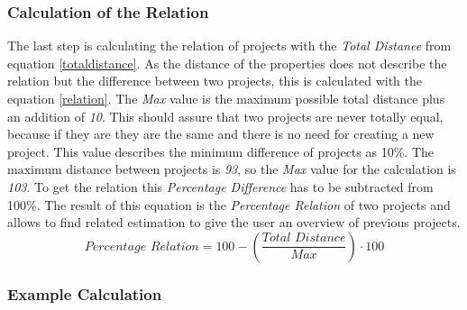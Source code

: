 \subsubsection{\textbf{ Calculation of the Relation}}
The last step is calculating the relation of projects with the \textit{Total Distance} from equation \ref{totaldistance}. As the distance of the properties does not describe the relation but the difference between two projects, this is calculated with the equation \ref{relation}. The \textit{Max} value is the maximum possible total distance plus an addition of \textit{10}. This should assure that two projects are never totally equal, because if they are they are the same and there is no need for creating a new project. This value describes the minimum difference of projects as 10\%. The maximum distance between projects is \textit{93}, so the \textit{Max} value for the calculation is \textit{103}. To get the relation this \textit{Percentage Difference} has to be subtracted from 100\%. The result of this equation is the \textit{Percentage Relation} of two projects and allows to find related estimation to give the user an overview of previous projects.\\
\begin{equation}
\textit{Percentage Relation} =  100 - (\frac{\textit{Total Distance}}{\textit{Max}})\cdot 100\label{relation}
\end{equation}
\subsubsection{\textbf{Example Calculation}}

